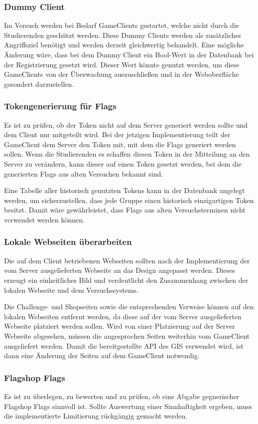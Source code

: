 \subsubsection{Dummy Client}
Im Versuch werden bei Bedarf GameClients gestartet, welche nicht durch die Studierenden geschützt werden. Diese Dummy Clients werden als zusätzliches Angriffsziel benötigt und werden derzeit gleichwertig behandelt. Eine mögliche Änderung wäre, dass bei dem Dummy Client ein Bool-Wert in der Datenbank bei der Registrierung gesetzt wird. Dieser Wert könnte genutzt werden, um diese GameClients von der Überwachung auszuschließen und in der Weboberfläche gesondert darzustellen.

\subsubsection{Tokengenerierung für Flags}
Es ist zu prüfen, ob der Token nicht auf dem Server generiert werden sollte und dem Client nur mitgeteilt wird. Bei der jetzigen Implementierung teilt der GameClient dem Server den Token mit, mit dem die Flags generiert werden sollen. Wenn die Studierenden es schaffen diesen Token in der Mitteilung an den Server zu verändern, kann dieser auf einen Token gesetzt werden, bei dem die generierten Flags aus alten Versuchen bekannt sind.

Eine Tabelle aller historisch genutzten Tokens kann in der Datenbank angelegt werden, um sicherzustellen, dass jede Gruppe einen historisch einzigartigen Token besitzt. Damit wäre gewährleistet, dass Flags aus alten Versuchsterminen nicht verwendet werden können.

\subsubsection{Lokale Webseiten überarbeiten}
Die auf dem Client betriebenen Webseiten sollten nach der Implementierung der vom Server ausgelieferten Webseite an das Design angepasst werden. Dieses erzeugt ein einheitliches Bild und verdeutlicht den Zusammenhang zwischen der lokalen Webseite und dem Versuchssystems.

Die Challenge- und Shopseiten sowie die entsprechenden Verweise können auf den lokalen Webseiten entfernt werden, da diese auf der vom Server ausgelieferten Webseite platziert werden sollen. Wird von einer Platzierung auf der Server Webseite abgesehen, müssen die angesprochen Seiten weiterhin vom GameClient ausgeliefert werden. Damit die bereitgestellte API des GIS verwendet wird, ist dann eine Änderung der Seiten auf dem GameClient notwendig.

\subsubsection{Flagshop Flags}
Es ist zu überlegen, zu bewerten und zu prüfen, ob eine Abgabe gegnerischer Flagshop Flags sinnvoll ist. Sollte Auswertung einer Sinnhaftigkeit ergeben, muss die implementierte Limitierung rückgängig gemacht werden.